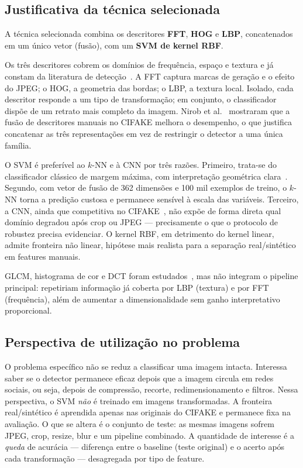 \documentclass[12pt]{article}
\begin{document}
\subsection{Justificativa da técnica selecionada}

A técnica selecionada combina os descritores \textbf{FFT}, \textbf{HOG} e \textbf{LBP}, concatenados em um único vetor (fusão), com um \textbf{SVM de kernel RBF}.

Os três descritores cobrem os domínios de frequência, espaço e textura e já constam da literatura de detecção~\cite{frank2020frequency,bammey2024synthbuster,nirob2026handcrafted,dalal2005hog,ojala2002lbp}. A FFT captura marcas de geração e o efeito do JPEG; o HOG, a geometria das bordas; o LBP, a textura local. Isolado, cada descritor responde a um tipo de transformação; em conjunto, o classificador dispõe de um retrato mais completo da imagem. Nirob et al.~\cite{nirob2026handcrafted} mostraram que a fusão de descritores manuais no CIFAKE melhora o desempenho, o que justifica concatenar as três representações em vez de restringir o detector a uma única família.

O SVM é preferível ao $k$-NN e à CNN por três razões. Primeiro, trata-se do classificador clássico de margem máxima, com interpretação geométrica clara~\cite{cortes1995svm}. Segundo, com vetor de fusão de 362 dimensões e 100 mil exemplos de treino, o $k$-NN torna a predição custosa e permanece sensível à escala das variáveis. Terceiro, a CNN, ainda que competitiva no CIFAKE~\cite{bird2024cifake}, não expõe de forma direta qual domínio degradou após crop ou JPEG --- precisamente o que o protocolo de robustez precisa evidenciar. O kernel RBF, em detrimento do kernel linear, admite fronteira não linear, hipótese mais realista para a separação real/sintético em features manuais.

GLCM, histograma de cor e DCT foram estudados~\cite{nirob2026handcrafted,gonzalez2018}, mas não integram o pipeline principal: repetiriam informação já coberta por LBP (textura) e por FFT (frequência), além de aumentar a dimensionalidade sem ganho interpretativo proporcional.

\subsection{Perspectiva de utilização no problema}

O problema específico não se reduz a classificar uma imagem intacta. Interessa saber se o detector permanece eficaz depois que a imagem circula em redes sociais, ou seja, depois de compressão, recorte, redimensionamento e filtros. Nessa perspectiva, o SVM \emph{não} é treinado em imagens transformadas. A fronteira real/sintético é aprendida apenas nas originais do CIFAKE e permanece fixa na avaliação. O que se altera é o conjunto de teste: as mesmas imagens sofrem JPEG, crop, resize, blur e um pipeline combinado. A quantidade de interesse é a \emph{queda} de acurácia --- diferença entre o baseline (teste original) e o acerto após cada transformação --- desagregada por tipo de feature.
\end{document}
